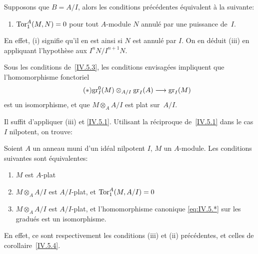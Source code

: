 \begin{corollaire}
\label{IV.5.3}
Supposons que $B = A/I$, alors les conditions pr\'ec\'edentes
\'equivalent \`a la suivante:
\begin{enumerate}
\item[(iii)] $\operatorname{Tor}_1^A(M,N) = 0$ pour tout $A$-module $N$ annul\'e
par une puissance de~$I$.
\end{enumerate}
\end{corollaire}

En effet, (i) signifie qu'il en est ainsi si $N$ est annul\'e par
$I$. On en d\'eduit (iii) en appliquant l'hypoth\`ese aux
$I^nN/I^{n+1}N$.

\begin{corollaire}
\label{IV.5.4}
Sous les conditions de~\ref{IV.5.3}, les conditions envisag\'ees
impliquent que
l'ho\-mo\-mor\-phisme fonctoriel
\begin{equation*}
\label{eq:IV.5.*}
\tag{$*$} {\gr_I^0(M) \otimes_{A/I} \gr_I(A) \to \gr_I(M)}
\end{equation*}
est un isomorphisme, et que $M \otimes_A A/I$ est plat sur~$A/I$.
\end{corollaire}

Il suffit d'appliquer (iii) et \eqref{IV.5.1}. Utilisant la
r\'eciproque de~\ref{IV.5.1} dans le cas $I$ nilpotent, on trouve:
\begin{corollaire}
\label{IV.5.5}
Soient $A$ un anneau muni d'un id\'eal nilpotent $I$, $M$ un
$A$-module. Les conditions suivantes sont \'equivalentes:
\begin{enumerate}
\item[(i)] $M$ est $A$-plat
\item[(ii)] $M \otimes_A A/I$ est $A/I$-plat, et $\operatorname{Tor}_1^A(M,A/I) = 0$
\item[(iii)] $M \otimes_A A/I$ est $A/I$-plat, et l'homomorphisme
canonique \eqref{eq:IV.5.*} sur les gradu\'es est un isomorphisme.
\end{enumerate}
\end{corollaire}

En effet, ce sont respectivement les conditions (iii) et (ii)
pr\'ec\'edentes, et celles de corollaire~\ref{IV.5.4}.

